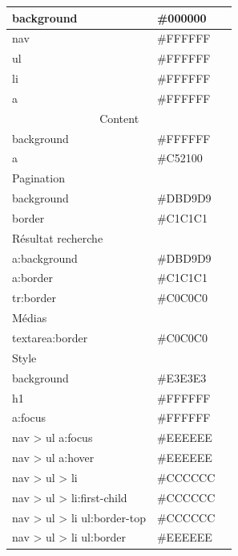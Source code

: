 \documentclass[letter, 11pt]{report}
\begin{document}
\begin{table}[h]
\begin{center}
\begin{tabular}{|l|l|l|}
		background 					& \#000000 & \cellcolor[HTML]{000000} \\ \hline
		nav        					& \#FFFFFF & \cellcolor[HTML]{FFFFFF} \\ \hline
		ul         					& \#FFFFFF & \cellcolor[HTML]{FFFFFF} \\ \hline
		li         					& \#FFFFFF & \cellcolor[HTML]{FFFFFF} \\ \hline
		a          					& \#FFFFFF & \cellcolor[HTML]{FFFFFF} \\ \hline
		\multicolumn{3}{|c|}{Content} \\ \hline
		background 					& \#FFFFFF & \cellcolor[HTML]{FFFFFF} \\ \hline
		a							& \#C52100 & \cellcolor[HTML]{C52100} \\ \hline
		\multicolumn{3}{|l|}{Pagination} \\ \hline
		background 					& \#DBD9D9 & \cellcolor[HTML]{DBD9D9} \\ \hline
		border 	   					& \#C1C1C1 & \cellcolor[HTML]{C1C1C1} \\ \hline
		\multicolumn{3}{|l|}{Résultat recherche} \\ \hline
		a:background 				& \#DBD9D9 & \cellcolor[HTML]{DBD9D9} \\ \hline
		a:border   					& \#C1C1C1 & \cellcolor[HTML]{C1C1C1} \\ \hline
		tr:border  					& \#C0C0C0 & \cellcolor[HTML]{C0C0C0} \\ \hline
		\multicolumn{3}{|l|}{Médias} \\ \hline
		textarea:border 			& \#C0C0C0 & \cellcolor[HTML]{C0C0C0} \\ \hline
		\multicolumn{3}{|l|}{Style} \\ \hline
		background 					& \#E3E3E3 & \cellcolor[HTML]{E3E3E3} \\ \hline
		h1 							& \#FFFFFF & \cellcolor[HTML]{FFFFFF} \\ \hline
		a:focus 					& \#FFFFFF & \cellcolor[HTML]{FFFFFF} \\ \hline
		nav > ul a:focus 			& \#EEEEEE & \cellcolor[HTML]{EEEEEE} \\ \hline
		nav > ul a:hover 			& \#EEEEEE & \cellcolor[HTML]{EEEEEE} \\ \hline
		nav > ul > li 				& \#CCCCCC & \cellcolor[HTML]{CCCCCC} \\ \hline
		nav > ul > li:first-child 	& \#CCCCCC & \cellcolor[HTML]{CCCCCC} \\ \hline
		nav > ul > li ul:border-top & \#CCCCCC & \cellcolor[HTML]{CCCCCC} \\ \hline
		nav > ul > li ul:border 	& \#EEEEEE & \cellcolor[HTML]{EEEEEE} \\ \hline
		\end{tabular}
	\end{center}
\end{table}
\end{document}

